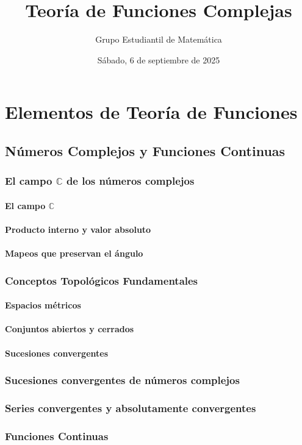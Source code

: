 \documentclass{report}
\title{Teoría de Funciones Complejas}
\author{Grupo Estudiantil de Matemática}
\date{Sábado, 6 de septiembre de 2025}
\begin{document}
\part{Elementos de Teoría de Funciones}
\chapter{Números Complejos y Funciones Continuas}
\section{El campo $\mathbb{C}$ de los números complejos}
\subsection{El campo $\mathbb{C}$}
\subsection{Producto interno y valor absoluto}
\subsection{Mapeos que preservan el ángulo}
\section{Conceptos Topológicos Fundamentales}
\subsection{Espacios métricos}
\subsection{Conjuntos abiertos y cerrados}
\subsection{Sucesiones convergentes}
\section{Sucesiones convergentes de números complejos}
\section{Series convergentes y absolutamente convergentes}
\section{Funciones Continuas}
\end{document}
